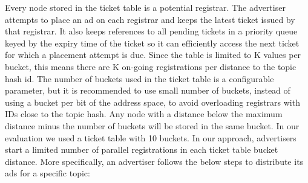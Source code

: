 Every node stored in the ticket table is a potential registrar. The advertiser attempts to place an ad on each registrar and keeps the latest ticket issued by that registrar. It also keeps references to all pending tickets in a priority queue keyed by the expiry time of the ticket so it can efficiently access the next ticket for which a placement attempt is due.
Since the table is limited to K values per bucket,  this means there are K on-going registrations per distance to the topic hash id. 
The number of buckets used in the ticket table is a configurable parameter, but it is recommended to use small number of buckets,  instead of using a bucket per bit of the address space,  to avoid overloading registrars with IDs close to the topic hash. 
Any node with a distance below the maximum distance minus the number of buckets will be stored in the same bucket.
In our evaluation we used a ticket table with 10 buckets. 
In our approach,  advertisers start a limited number of parallel registrations in each ticket table bucket distance.
 More specifically, an advertiser follows the below steps to distribute its ads for a specific topic:

